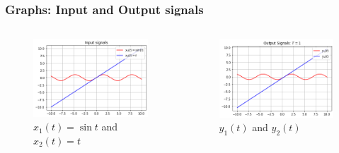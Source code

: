 \documentclass{beamer}
\begin{document}
\begin{frame}
  \frametitle{Graphs: Input and Output signals}
 \begin{columns}
\begin{column}{0.5\textwidth}
\begin{figure}
\begin{flushleft}
\includegraphics[width=\columnwidth]{graphs/input_signals.png}
 \caption{$x_1(t) = \sin{t}$ and $x_2(t) = t$}
\end{flushleft}
\end{figure}
\end{column}
\begin{column}{0.5\textwidth}
\begin{figure}
\begin{flushleft}
\includegraphics[width=\columnwidth]{graphs/output_signals.png}
 \caption{$y_1(t)$ and  $y_2(t)$}
\end{flushleft}
\end{figure}
\end{column}
\end{columns}
   
   
\end{frame}
\end{document}
